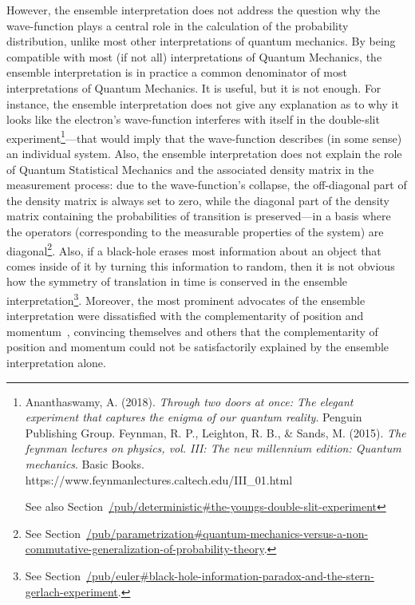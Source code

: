 \documentclass[11pt]{book}
\begin{document}
However, the ensemble interpretation does not address the question why
the wave-function plays a central role in the calculation of the
probability distribution, unlike most other interpretations of quantum
mechanics. By being compatible with most (if not all) interpretations of
Quantum Mechanics, the ensemble interpretation is in practice a common
denominator of most interpretations of Quantum Mechanics. It is useful,
but it is not enough. For instance, the ensemble interpretation does not
give any explanation as to why it looks like the electron's
wave-function interferes with itself in the double-slit
experiment\footnote{Ananthaswamy, A. (2018). \emph{Through two doors at
  once: The elegant experiment that captures the enigma of our quantum
  reality}. Penguin Publishing Group. Feynman, R. P., Leighton, R. B.,
  \& Sands, M. (2015). \emph{The feynman lectures on physics, vol. III:
  The new millennium edition: Quantum mechanics}. Basic Books.
  https://www.feynmanlectures.caltech.edu/III\_01.html

  See also
  Section~\url{/pub/deterministic\#the-youngs-double-slit-experiment}}---that
would imply that the wave-function describes (in some sense) an
individual system. Also, the ensemble interpretation does not explain
the role of Quantum Statistical Mechanics and the associated density
matrix in the measurement process: due to the wave-function's collapse,
the off-diagonal part of the density matrix is always set to zero, while
the diagonal part of the density matrix containing the probabilities of
transition is preserved---in a basis where the operators (corresponding
to the measurable properties of the system) are diagonal\footnote{See
  Section~\url{/pub/parametrization\#quantum-mechanics-versus-a-non-commutative-generalization-of-probability-theory}.}.
Also, if a black-hole erases most information about an object that comes
inside of it by turning this information to random, then it is not
obvious how the symmetry of translation in time is conserved in the
ensemble interpretation\footnote{See
  Section~\url{/pub/euler\#black-hole-information-paradox-and-the-stern-gerlach-experiment}.}.
Moreover, the most prominent advocates of the ensemble interpretation
were dissatisfied with the complementarity of position and
momentum~\cite{Einstein1935Can}\cite{BALLENTINE1970statistical}, convincing themselves and others that the complementarity of
position and momentum could not be satisfactorily explained by the
ensemble interpretation alone.
\end{document}

